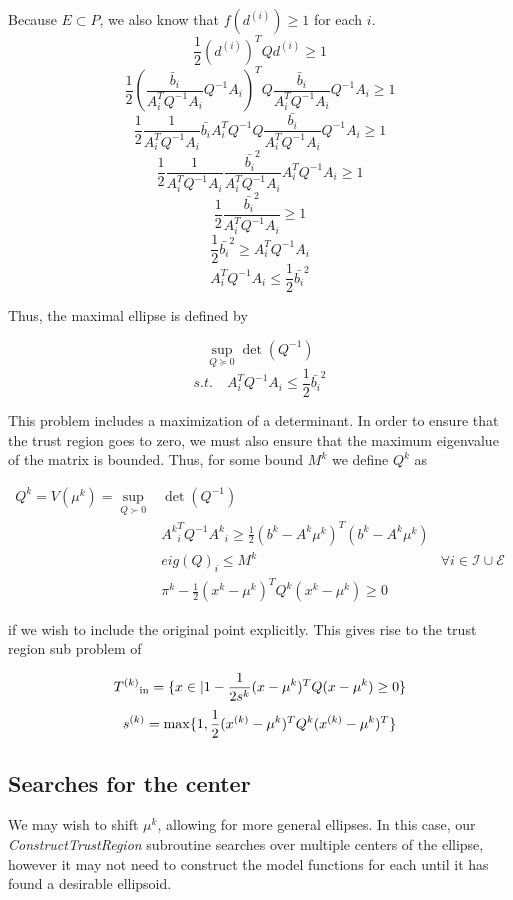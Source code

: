 Because $E \subset P$, we also know that $f(d^{(i)}) \ge 1$ for each $i$.
\[
\frac 1 2 (d^{(i)})^{T} Q d^{(i)} \ge 1
\]
\[
\frac 1 2 (\frac {\bar{b}_i}{A_i^T  Q^{-1}A_i}  Q^{-1}A_i)^{T} Q \frac {\bar{b}_i}{A_i^T  Q^{-1}A_i}  Q^{-1}A_i \ge 1
\]
\[
\frac 1 2 \frac {1}{A_i^T  Q^{-1}A_i}  \bar{b_i} A_i^T Q^{-1} Q \frac {\bar{b_i}}{A_i^T  Q^{-1}A_i}  Q^{-1}A_i \ge 1
\]
\[
\frac 1 2 \frac {1}{A_i^T  Q^{-1}A_i}  \frac {\bar{b_i}^2}{A_i^T  Q^{-1}A_i}  A_i^T Q^{-1}A_i \ge 1
\]
\[
\frac 1 2  \frac {\bar{b_i}^2}{A_i^T  Q^{-1}A_i} \ge 1
\]
\[
\frac 1 2 \bar{b_i}^2\ge A_i^T  Q^{-1}A_i
\]
\[
A_i^T  Q^{-1}A_i \le \frac 1 2 \bar{b_i}^2
\]

Thus, the maximal ellipse is defined by

\[
\sup_{Q \succeq 0} \det(Q^{-1})
\]
\[
s.t. \quad A_i^T Q^{-1} A_i \le \frac 1 2 \bar{b_i}^2
\]


This problem includes a maximization of a determinant.
In order to ensure that the trust region goes to zero, we must also ensure that the maximum eigenvalue of the matrix is bounded.
Thus, for some bound $M^k$ we define $Q^k$ as

\begin{center}
\begin{align}
\label{ellipse_1}
Q^k = V(\mu^k) = \sup_{Q \succ 0} & \det(Q^{-1}) & \\
  & {A^k}_i^T Q^{-1} {A^k}_i \ge \frac 1 2 (b^k - A^k\mu^{k})^T(b^k - A^k \mu^{k}) & \\
  & eig(Q)_i \le M^k & \forall i \in \mathcal I \cup \mathcal E \\
  & \pi^k - \frac 1 2 (x^k - \mu^{k})^TQ^{k}(x^k - \mu^{k}) \ge 0
\end{align}
\end{center}

if we wish to include the original point explicitly.
This gives rise to the trust region sub problem of

$${T^{(k)}}_{\text{in}} = \{x \in \mathbb | 1 - \frac 1 {2s^k} (x - \mu^{k})^T Q (x - \mu^{k}) \ge 0\} $$
$${s}^{(k)} = \max \{1, \frac 1 {2} ({x}^{(k)} - \mu^{k})^T Q^k ({x}^{(k)} - \mu^{k})^T \}$$


\subsection{Searches for the center}

We may wish to shift $\mu^k$, allowing for more general ellipses.
In this case, our \emph{ConstructTrustRegion} subroutine searches over multiple centers of the ellipse, however it may not need to construct the model functions for each until it has found a desirable ellipsoid.

